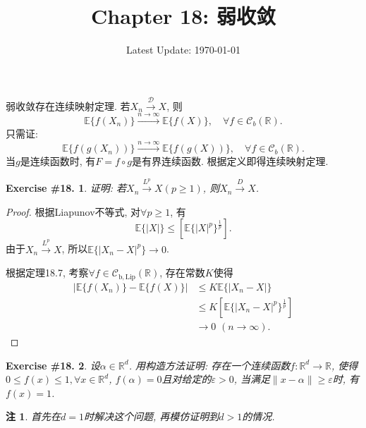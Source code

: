 \documentclass[UTF8, a4paper]{article}
\title{Chapter 18: 弱收敛}
\author{}
\date{Latest Update: \today}
\newtheorem{exercise}{Exercise \#18.}
\newtheorem*{remark}{注}
\begin{document}
\maketitle

\begin{framed}
弱收敛存在连续映射定理.
若\(X_n \xrightarrow{\mathcal{D}} X\), 
则
$$
\mathbb{E}\{f(X_n)\} \xrightarrow{n\to\infty} \mathbb{E}\{f(X)\}, \quad \forall f \in \mathscr{C}_b(\mathbb{R}).
$$
只需证:
$$
\mathbb{E}\{f(g(X_n))\} \xrightarrow{n\to\infty} \mathbb{E}\{f(g(X))\}, \quad \forall f \in \mathscr{C}_b(\mathbb{R}).
$$
当\(g\)是连续函数时, 有\(F = f\circ g\)是有界连续函数. 根据定义即得连续映射定理.
\end{framed}



\begin{framed}
\begin{exercise}
证明: 若$X_n \xrightarrow{L^p} X(p \geq 1)$, 则$X_n \xrightarrow{D} X$.
\end{exercise}
\end{framed}

\begin{proof}
根据Liapunov不等式, 对\(\forall p \geq 1\), 有
$$
\mathbb{E}\{|X|\} \leq \left[\mathbb{E}\{|X|^p\}^{\frac{1}{p}}\right].
$$
由于\(X_n \xrightarrow{L^p} X\), 所以\(\mathbb{E}\{|X_n - X|^p\} \to 0\).

根据定理18.7, 考察\(\forall f \in \mathscr{C}_{\mathrm{b,Lip}}(\mathbb{R})\), 
存在常数\(K\)使得
\begin{align*}
    |\mathbb{E}\{f(X_n)\} - \mathbb{E}\{f(X)\}| &\leq K\mathbb{E}\{|X_n - X|\} \\
    &\leq K\left[\mathbb{E}\{|X_n - X|^p\}^{\frac{1}{p}}\right] \\
    & \to 0 \,\,(n\to \infty).
\end{align*}

\end{proof}





\begin{framed}
\begin{exercise}
设\(\alpha \in \mathbb{R}^d\). 用构造方法证明: 存在一个连续函数\(f: \mathbb{R}^d \to \mathbb{R}\), 使得
\(0 \leq f(x) \leq 1, \forall x \in \mathbb{R}^d\), \(f(\alpha) = 0\)且对给定的\(\varepsilon >0\), 当满足\(\|x - \alpha\| \geq \varepsilon\)时, 有\(f(x) = 1\).
\end{exercise}
\end{framed}
\begin{remark}
首先在\(d = 1\)时解决这个问题, 再模仿证明到\(d > 1\)的情况.
\end{remark}
\end{document}
